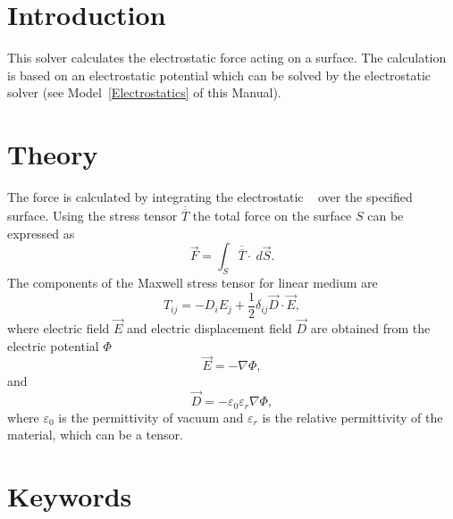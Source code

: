 \noindent
{}
\begin{versiona}


\section{Introduction}

This solver calculates the electrostatic force acting on a
surface. The calculation is based on an electrostatic potential which
can be solved by the electrostatic solver (see Model~\ref{Electrostatics}
of this Manual).


\section{Theory}

The force is calculated by integrating the electrostatic ~\cite{vanderlinde93} over the specified surface. Using
the stress tensor $\overline{\overline T}$ the total force on the
surface $S$ can be expressed as
\begin{equation}
\Vec{F} = \int_S \overline{\overline T}\cdot~d\Vec{S}.
\end{equation}
The components of the Maxwell stress tensor for linear medium are
\begin{equation}
T_{ij} = -D_iE_j + \frac{1}{2}\delta_{ij}\Vec{D}\cdot\Vec{E},
\end{equation}
where electric field $\vec{E}$ and electric displacement field
$\vec{D}$ are obtained from the electric potential $\Phi$
\begin{equation}
\vec{E} = -\nabla\Phi,
\end{equation}
and
\begin{equation}
\vec{D} = -\varepsilon_0\varepsilon_r\nabla\Phi,
\end{equation}
where $\varepsilon_0$ is the permittivity of vacuum and
$\varepsilon_r$ is the relative permittivity of the material, which
can be a tensor.


\section{Keywords}
\end{versiona}

\sifbegin
{}
\sifbegin
{}
\sifend

